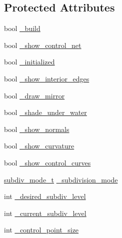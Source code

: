 \subsection*{Protected Attributes}
\begin{DoxyCompactItemize}
\item 
bool \hyperlink{classShipCADGeometry_1_1SubdivisionSurface_abdb049451d948cc92be79719e03adfff}{\-\_\-build}
\item 
bool \hyperlink{classShipCADGeometry_1_1SubdivisionSurface_a6d4fdb7be66c662f86b397792c9dada8}{\-\_\-show\-\_\-control\-\_\-net}
\item 
bool \hyperlink{classShipCADGeometry_1_1SubdivisionSurface_a3276e7cb242a6f2bbc1730ca4b545264}{\-\_\-initialized}
\item 
bool \hyperlink{classShipCADGeometry_1_1SubdivisionSurface_a419375e351105466cb3d9ac2b739c94f}{\-\_\-show\-\_\-interior\-\_\-edges}
\item 
bool \hyperlink{classShipCADGeometry_1_1SubdivisionSurface_a6401966145eb3c364946cd045be6deb0}{\-\_\-draw\-\_\-mirror}
\item 
bool \hyperlink{classShipCADGeometry_1_1SubdivisionSurface_a53759454945841ea3f10c033e3524382}{\-\_\-shade\-\_\-under\-\_\-water}
\item 
bool \hyperlink{classShipCADGeometry_1_1SubdivisionSurface_a4e91054edb430c269d3c3d53e85e3f05}{\-\_\-show\-\_\-normals}
\item 
bool \hyperlink{classShipCADGeometry_1_1SubdivisionSurface_ab539a00832aa77ab899ba9db730d8aff}{\-\_\-show\-\_\-curvature}
\item 
bool \hyperlink{classShipCADGeometry_1_1SubdivisionSurface_a0d76f9d22bf18c13a74aa336922094bb}{\-\_\-show\-\_\-control\-\_\-curves}
\item 
\hyperlink{classShipCADGeometry_1_1SubdivisionSurface_a0006dff46f8a47b8b37746602c6c2eca}{subdiv\-\_\-mode\-\_\-t} \hyperlink{classShipCADGeometry_1_1SubdivisionSurface_ac44334fa73b1d714146df68752e143be}{\-\_\-subdivision\-\_\-mode}
\item 
int \hyperlink{classShipCADGeometry_1_1SubdivisionSurface_a4199f489017ebae8a9a2dc08248414e3}{\-\_\-desired\-\_\-subdiv\-\_\-level}
\item 
int \hyperlink{classShipCADGeometry_1_1SubdivisionSurface_ab1e864d6bd7858f3ad98177c6c288416}{\-\_\-current\-\_\-subdiv\-\_\-level}
\item 
int \hyperlink{classShipCADGeometry_1_1SubdivisionSurface_ae25d19f752c08bb54c821433032ae156}{\-\_\-control\-\_\-point\-\_\-size}
\item 

\end{DoxyCompactItemize}

